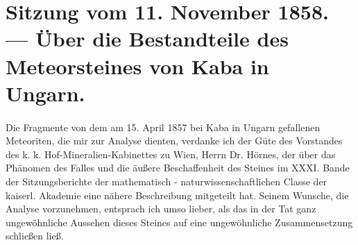 \documentclass[a4paper, 11pt, oneside]{article}
\begin{document}
\section{Sitzung vom 11. November 1858. --- Über die Bestandteile des Meteorsteines von Kaba in Ungarn.}
\paragraph{}
Die Fragmente von dem am 15. April 1857 bei Kaba in Ungarn gefallenen Meteoriten, die mir zur Analyse dienten, verdanke ich der Güte des Vorstandes des k. k. Hof-Mineralien-Kabinettes zu Wien, Herrn Dr. Hörnes, der über das Phänomen des Falles und die äußere Beschaffenheit des Steines im XXXI. Bande der Sitzungsberichte der mathematisch - naturwissenschaftlichen Classe der kaiserl. Akademie eine nähere Beschreibung mitgeteilt hat. Seinem Wunsche, die Analyse vorzunehmen, entsprach ich umso lieber, als das in der Tat ganz ungewöhnliche Aussehen dieses Steines auf eine ungewöhnliche Zusammensetzung schließen ließ.
\end{document}
